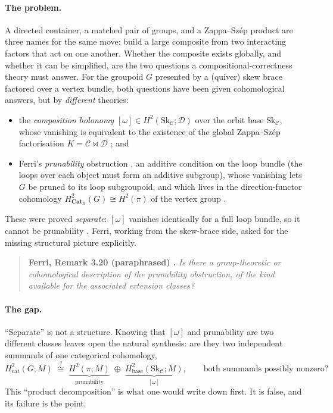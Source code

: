 \documentclass[11pt]{article}
\theoremstyle{definition}
\newcommand{\Sk}{\mathrm{Sk}}
\newcommand{\C}{\mathcal{C}}
\newcommand{\D}{\mathcal{D}}
\newcommand{\CatB}{\mathbf{Cat}_B}
\begin{document}
\paragraph{The problem.} A directed container, a matched pair of groups, and a Zappa--Sz\'ep
product are three names for the same move: build a large composite from two interacting
factors that act on one another. Whether the composite exists globally, and whether it can
be simplified, are the two questions a compositional-correctness theory must answer. For the
groupoid $G$ presented by a (quiver) skew brace factored over a vertex bundle, both questions
have been given cohomological answers, but by \emph{different} theories:
\begin{itemize}
\item[\textbf{(H)}] the \emph{composition holonomy} $[\omega]\in H^2(\Sk_\C;\D)$ over the
orbit base $\Sk_\C$, whose vanishing is equivalent to the existence of the global
Zappa--Sz\'ep factorisation $K=\C\bowtie\D$ \cite{gobstr,gzs}; and
\item[\textbf{(P)}] Ferri's \emph{prunability} obstruction \cite{ferri}, an additive
condition on the loop bundle (the loops over each object must form an additive subgroup),
whose vanishing lets $G$ be pruned to its loop subgroupoid, and which lives in the
direction-functor cohomology $H^2_{\CatB}(G)\cong H^2(\pi)$ of the vertex group
\cite{adm,sep2}.
\end{itemize}
These were proved \emph{separate}: $[\omega]$ vanishes identically for a full loop bundle,
so it cannot be prunability \cite{sep}. Ferri, working from the skew-brace side, asked for
the missing structural picture explicitly.

\begin{quote}\small
\textbf{Ferri, Remark 3.20 (paraphrased) \cite{ferri}.} \emph{Is there a group-theoretic or
cohomological description of the prunability obstruction, of the kind available for the
associated extension classes?}
\end{quote}

\paragraph{The gap.} ``Separate'' is not a structure. Knowing that $[\omega]$ and
prunability are two different classes leaves open the natural synthesis: are they two
independent summands of one categorical cohomology,
\begin{equation}\label{eq:conj}
   H^2_{\mathrm{cat}}(G;M)\;\overset{?}{\cong}\;
   \underbrace{H^2(\pi;M)}_{\text{prunability}}\;\oplus\;
   \underbrace{H^2_{\mathrm{base}}(\Sk_\C;M)}_{[\omega]},
   \qquad\text{both summands possibly nonzero?}
\end{equation}
This ``product decomposition'' is what one would write down first. It is false, and its
failure is the point.
\end{document}
